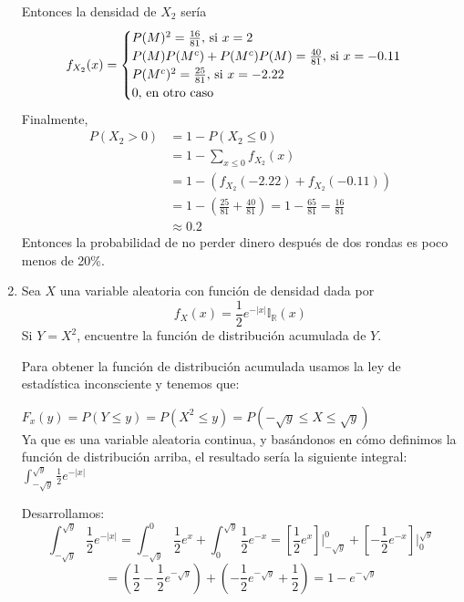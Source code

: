 \documentclass[12pt,a4paper]{report}
\begin{document}
\begin{enumerate}
{			Entonces la densidad de $X_2$ sería
			\[
				f_{X_2}(x) = \begin{cases}
							P(M)^2 = \frac{16}{81}, $ si $ x = 2\\
							P(M)P(M^c) + P(M^c)P(M) = \frac{40}{81}, $ si $ x = -0.11\\
							P(M^c)^2 = \frac{25}{81}, $ si $ x = -2.22\\
							0, $ en otro caso$
						 \end{cases}
			\]
			Finalmente,
			\begin{align*}
				P(X_2 > 0) &= 1 - P(X_2 \leq 0) \\
						 &= 1 - \sum_{x \leq 0}{f_{X_2}(x)}\\
						 &= 1 - (f_{X_2}(-2.22)+f_{X_2}(-0.11))\\
						 &= 1 - (\frac{25}{81} + \frac{40}{81})
						 = 1- \frac{65}{81}
						 = \frac{16}{81}\\
						 &\approx 0.2
			\end{align*}
			Entonces la probabilidad de no perder dinero después de dos rondas
			es poco menos de 20\%.

		}

		\item {
			Sea $X$ una variable aleatoria con función de densidad dada por
			\[f_X(x) = \frac{1}{2}e^{-|x|}\mathbb{I}_{\mathbb{R}}(x)\]
			Si $Y = X^2$, encuentre la función de distribución acumulada de $Y$.

			Para obtener la función de distribución acumulada usamos la ley de estadística inconsciente y tenemos que:

		$F_{x}(y) = P(Y \leq y) = P(X^2\leq y) = P(-\sqrt{y} \leq X \leq \sqrt{y})$	\\

			Ya que es una variable aleatoria continua, y basándonos en cómo definimos la función de distribución arriba, el resultado sería la siguiente integral:
			$\int_{-\sqrt{y}}^{\sqrt{y}} \frac{1}{2}e^{-|x|}$

			Desarrollamos:
			 \[
               \int_{-\sqrt{y}}^{\sqrt{y}} \frac{1}{2}e^{-|x|}
                =
                 \int_{-\sqrt{y}}^{0} \frac{1}{2}e^{x}
                 +
                 \int_{0}^{\sqrt{y}} \frac{1}{2}e^{-x}
                =
                 \left[\frac{1}{2}e^{x}\right]\Big|_{-\sqrt{y}}^{0}
                 +
                 \left[-\frac{1}{2}e^{-x}\right]\Big|_{0}^{\sqrt{y}}
             \]
             \[
                           =
                \left(\frac{1}{2} - \frac{1}{2}e^{-\sqrt{y}}\right)
                +
                \left(- \frac{1}{2}e^{-\sqrt{y}} + \frac{1}{2}\right)
                =
                1 - e^{-\sqrt{y}}
            \]

}
\end{enumerate}
\end{document}
